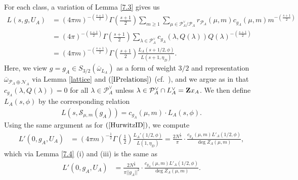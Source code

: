 \documentclass{amsart}
\theoremstyle{definition}
\theoremstyle{definition}
\theoremstyle{definition}
\begin{document}
For each class, a variation of Lemma \ref{7.3} gives us
\begin{equation*}\begin{aligned} L(s, g, U_A) &= (4 \pi m)^{- \left( \frac{s+1}{2} \right)} \Gamma \left( \frac{s+1}{2} \right)  \sum\limits_{m \geq 1} 
\sum\limits_{\mu \in \mathcal{P}_A^{\vee}/ \mathcal{P}_A} r_{\mathcal{P}_A}(\mu, m) c_{g_A}(\mu, m ) m^{- \left( \frac{s+1}{2} \right)} \\
&= (4 \pi)^{- \left( \frac{s+1}{2} \right)} \Gamma \left( \frac{s+1}{2} \right) 
\sum\limits_{\lambda \in \mathcal{P}_A^{\vee} } c_{g_A}(\lambda, Q(\lambda)) Q(\lambda)^{- \left( \frac{s+1}{2} \right)} \\
&= (4 \pi m)^{- \left( \frac{s+1}{2} \right)} \Gamma \left( \frac{s+1}{2} \right) \frac{L_A(s+1/2, \phi)}{L(s+1, \eta_{D})}. \end{aligned}\end{equation*}
Here, we view $g = g_A \in S_{3/2}(\overline{\omega}_{L_A})$ as a form of weight $3/2$ and representation $\overline{\omega}_{ \mathcal{P}_A \oplus \mathcal{N}_A }$ 
via Lemma \ref{lattice} and $(\ref{IPrelations})$ (cf.~\cite[Lemma 3.1]{BY}), 
and we argue as in \cite[Lemma 7.3]{BY} that $c_{g_A}(\lambda, Q(\lambda)) = 0$ for all $\lambda \in \mathcal{P}_A^{\vee}$ 
unless $\lambda \in \mathcal{P}_A^{\vee} \cap L_A^{\vee} = {\bf{Z}} x_A$. We then define $L_A(s, \phi)$ by the corresponding relation
\begin{align*} L(s, \mathcal{S}_{\mu,m}(g_A)) = c_{g_A}(\mu,m) \cdot L_A(s, \phi). \end{align*}
Using the same argument as for $(\ref{HurwitzID})$, we compute 
\begin{align*} L'(0, g_A, U_A) &= (4 \pi m)^{-\frac{1}{2}} \Gamma \left(  \frac{1}{2} \right) \frac{L_A'(1/2, \phi)}{L(1, \eta_{D})} 
= \frac{ 2 N^{\frac{1}{2}}}{\pi} \cdot \frac{ c_{g_A}(\mu,m) L'_A(1/2, \phi)}{\deg Z_A(\mu, m)}, \end{align*}
which via Lemma \ref{7.4} (i) and (iii) is the same as 
\begin{align}\label{HurwitzA} L'(0, g_A, U_A) 
&= \frac{2 N^{\frac{1}{2}}}{ \pi \vert \vert g_A \vert \vert^2} \cdot \frac{ c_{g_A}(\mu,m) L'_A(1/2, \phi)}{\deg Z_A(\mu, m)}. \end{align}
\end{document}
